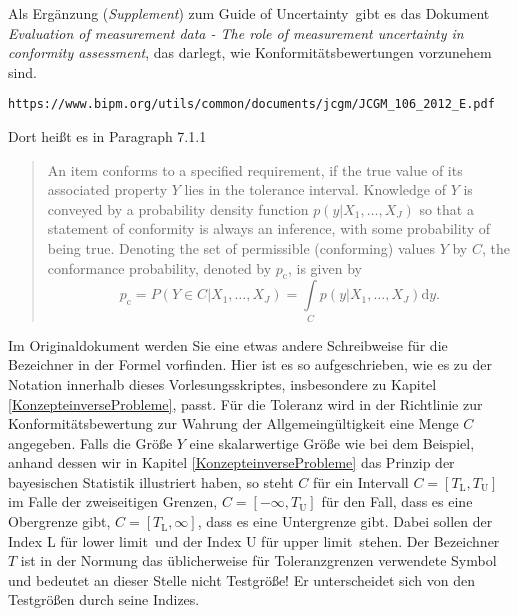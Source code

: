 Als Ergänzung (\textsl{Supplement}) zum \glqq Guide of Uncertainty\grqq ~gibt es das Dokument
\textsl{Evaluation of measurement data - The role of measurement uncertainty in conformity assessment},
das darlegt, wie Konformitätsbewertungen vorzunehem sind.
\begin{verbatim}
https://www.bipm.org/utils/common/documents/jcgm/JCGM_106_2012_E.pdf
\end{verbatim}
Dort heißt es in Paragraph 7.1.1
\begin{quote}
An item conforms to a specified requirement,
if the true value of its associated property $Y$ lies in the tolerance
interval. Knowledge of $Y$ is conveyed by a probability density function $p(y|{X_1,\dots,X_J})$
so that a statement of conformity is always an inference,
with some probability of being true. Denoting the set of permissible (conforming) values
$Y$ by $C$, the conformance probability, denoted by $p_\mathrm{c}$, is given by
\begin{equation}
	p_\mathrm{c} = P(Y \in C | {X_1,\dots,X_J}) = \int\limits_C p(y|{X_1,\dots,X_J}) \mathrm{d}y.
\end{equation}
\end{quote}
Im Originaldokument werden Sie eine etwas andere Schreibweise für die Bezeichner in der Formel vorfinden.
Hier ist es so aufgeschrieben, wie es zu der Notation innerhalb dieses Vorlesungsskriptes, insbesondere
zu Kapitel \ref{KonzepteinverseProbleme}, passt.
Für die Toleranz wird in der Richtlinie zur Konformitätsbewertung zur Wahrung der Allgemeingültigkeit
eine Menge $C$ angegeben. Falls die Größe $Y$ eine skalarwertige Größe wie bei dem Beispiel, anhand dessen
wir in Kapitel \ref{KonzepteinverseProbleme} das Prinzip der bayesischen Statistik illustriert haben,
so steht $C$ für ein Intervall $C = [T_\mathrm{L}, T_\mathrm{U}]$ im Falle der zweiseitigen
Grenzen, $C = [-\infty, T_\mathrm{U}]$ für den Fall, dass es eine Obergrenze gibt,
$C = [T_\mathrm{L}, \infty]$, dass es eine Untergrenze gibt. Dabei sollen der Index L für \glqq lower
limit\grqq ~und der Index U für \glqq upper limit\grqq ~stehen. Der Bezeichner $T$ ist in der
Normung das üblicherweise für Toleranzgrenzen verwendete Symbol und bedeutet an dieser
Stelle nicht Testgröße! Er unterscheidet sich von den Testgrößen durch seine Indizes.

